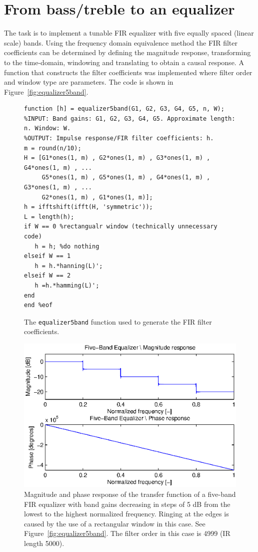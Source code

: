 \section{From bass/treble to an equalizer}
The task is to implement a tunable FIR equalizer with five equally spaced (linear scale) bands.
Using the frequency domain equivalence method the FIR filter coefficients can be determined by defining the magnitude response, transforming to the time-domain, windowing and translating to obtain a causal response. A function that constructs the filter coefficients was implemented where filter order and window type are parameters. The code is shown in Figure~\ref{fig:equalizer5band}.
\begin{figure}[H]
\center
\begin{lstlisting}
function [h] = equalizer5band(G1, G2, G3, G4, G5, n, W);
%INPUT: Band gains: G1, G2, G3, G4, G5. Approximate length: n. Window: W.
%OUTPUT: Impulse response/FIR filter coefficients: h.
m = round(n/10);
H = [G1*ones(1, m) , G2*ones(1, m) , G3*ones(1, m) , G4*ones(1, m) , ...
     G5*ones(1, m) , G5*ones(1, m) , G4*ones(1, m) , G3*ones(1, m) , ...
     G2*ones(1, m) , G1*ones(1, m)];
h = ifftshift(ifft(H, 'symmetric'));
L = length(h);
if W == 0 %rectangualr window (technically unnecessary code)
   h = h; %do nothing
elseif W == 1
   h = h.*hanning(L)';
elseif W == 2
   h =h.*hamming(L)'; 
end
end %eof
\end{lstlisting}
\caption{The \texttt{equalizer5band} function used to generate the FIR filter coefficients.}
\label{fig:equalizer5band}
\includegraphics[scale=1]{./picture/FiveBandEqualizer.eps}%
\caption{Magnitude and phase response of the transfer function of a five-band FIR equalizer with band gains decreasing in steps of 5 dB from the lowest to the highest normalized frequency. Ringing at the edges is caused by the use of a rectangular window in this case. See Figure~\ref{fig:equalizer5band}. The filter order in this case is 4999 (IR length 5000).}
\label{fig:FiveBandEqualizer}
\end{figure}

